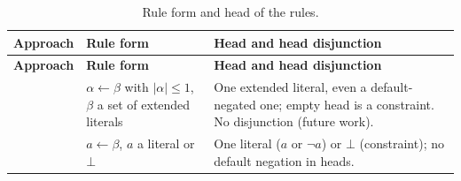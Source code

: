     {\scriptsize
        \renewcommand{\arraystretch}{1.25}
        \setlength{\tabcolsep}{3pt}
        \begin{longtable}{@{}p{}p{}p{}@{}}
            \caption{Rule form and head of the rules.}\label{tab:syntax-heads}                                                                                                                                                                                                                                                                                                                                                                    \\
            \toprule
            \textbf{Approach}                     & \textbf{Rule form}                                                                                                                                      & \textbf{Head and head disjunction}                                                                                                                                                                                                  \\
            \midrule\endfirsthead
            \toprule
            \textbf{Approach}                     & \textbf{Rule form}                                                                                                                                      & \textbf{Head and head disjunction}                                                                                                                                                                                                  \\
            \midrule\endhead
            \bottomrule\endfoot
            \cite{VanNieuwenborghDV06}            & $\alpha\leftarrow\beta$ with $|\alpha|\leq1$, $\beta$ a set of extended literals                                                                        & One extended literal, even a default-negated one; empty head is a constraint. No disjunction (future work).                                                                                                                         \\
            \cite{VanNieuwenborghDV07}            & $a\leftarrow\beta$, $a$ a literal or $\bot$                                                                                                             & One literal ($a$ or $\neg a$) or $\bot$ (constraint); no default negation in heads.                                                                                                                                                 \\

\end{longtable}}
